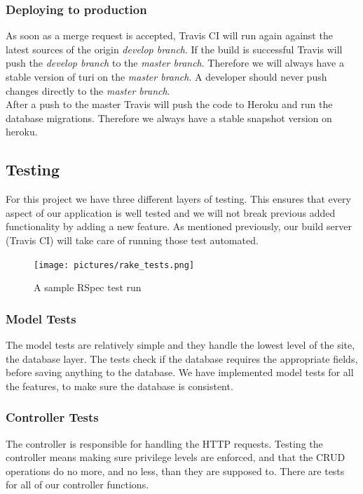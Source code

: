 \documentclass[a4paper]{article}
\begin{document}
\subsubsection{Deploying to production}
As soon as a merge request is accepted, Travis CI will run again against the latest sources of the origin \textit{develop branch}. If the build is successful Travis will push the \textit{develop branch} to the \textit{master branch}. Therefore we will always have a stable version of turi on the \textit{master branch}. A developer should never push changes directly to the \textit{master branch}.\\

\noindent
After a push to the master Travis will push the code to Heroku and run the database migrations. Therefore we always have a stable snapshot version on heroku.

\subsection{Testing}
For this project we have three different layers of testing. This ensures that every aspect of our application is well tested and we will not break previous added functionality by adding a new feature. As mentioned previously, our build server (Travis CI) will take care of running those test automated.

\begin{figure}
  \begin{center}
    \texttt{[image: pictures/rake\_tests.png]}
    \caption{A sample RSpec test run}
    \label{fig:}
  \end{center}
\end{figure}

\subsubsection{Model Tests}
The model tests are relatively simple and they handle the lowest level of the site, the database layer. The tests check if the database requires the appropriate fields, before saving anything to the database. We have implemented model tests for all the features, to make sure the database is consistent.
\\

\subsubsection{Controller Tests}
The controller is responsible for handling the HTTP requests. Testing the controller means making sure privilege levels are enforced, and that the CRUD operations do no more, and no less, than they are supposed to. There are tests for all of our controller functions.
\\
\end{document}
